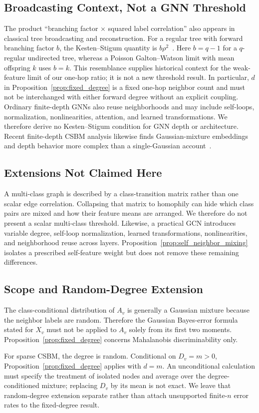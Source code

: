 \subsection{Broadcasting Context, Not a GNN Threshold}

The product ``branching factor $\times$ squared label correlation'' also appears in classical tree broadcasting and reconstruction. For a regular tree with forward branching factor $b$, the Kesten--Stigum quantity is $b\rho^2$~\citep{kesten1966additional,mossel2015reconstruction}. Here $b=q-1$ for a $q$-regular undirected tree, whereas a Poisson Galton--Watson limit with mean offspring $k$ uses $b=k$. This resemblance supplies historical context for the weak-feature limit of our one-hop ratio; it is not a new threshold result. In particular, $d$ in Proposition~\ref{prop:fixed_degree} is a fixed one-hop neighbor count and must not be interchanged with either forward degree without an explicit coupling. Ordinary finite-depth GNNs also reuse neighborhoods and may include self-loops, normalization, nonlinearities, attention, and learned transformations. We therefore derive no Kesten--Stigum condition for GNN depth or architecture. Recent finite-depth CSBM analysis likewise finds Gaussian-mixture embeddings and depth behavior more complex than a single-Gaussian account~\citep{pmlr-v269-dalle25a}.

\subsection{Extensions Not Claimed Here}

A multi-class graph is described by a class-transition matrix rather than one scalar edge correlation. Collapsing that matrix to homophily can hide which class pairs are mixed and how their feature means are arranged. We therefore do not present a scalar multi-class threshold. Likewise, a practical GCN introduces variable degree, self-loop normalization, learned transformations, nonlinearities, and neighborhood reuse across layers. Proposition~\ref{prop:self_neighbor_mixing} isolates a prescribed self-feature weight but does not remove these remaining differences.

\subsection{Scope and Random-Degree Extension}

The class-conditional distribution of $A_v$ is generally a Gaussian mixture because the neighbor labels are random. Therefore the Gaussian Bayes-error formula stated for $X_v$ must not be applied to $A_v$ solely from its first two moments. Proposition~\ref{prop:fixed_degree} concerns Mahalanobis discriminability only.

For sparse CSBM, the degree is random. Conditional on $D_v=m>0$, Proposition~\ref{prop:fixed_degree} applies with $d=m$. An unconditional calculation must specify the treatment of isolated nodes and average over the degree-conditioned mixture; replacing $D_v$ by its mean is not exact. We leave that random-degree extension separate rather than attach unsupported finite-$n$ error rates to the fixed-degree result.
